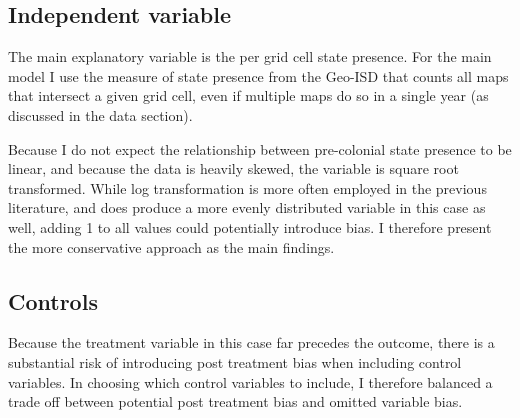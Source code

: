 \documentclass[12pt]{article}
\begin{document}

\subsection{Independent variable}

The main explanatory variable is the per grid cell state presence. For the main
model I use the measure of state presence from the Geo-ISD that counts all maps that
intersect a given grid cell, even if multiple maps do so in a single year (as
discussed in the data section).


Because I do not expect the relationship between pre-colonial state presence to
be linear, and because the data is heavily skewed, the variable is square root
transformed. While log transformation is more often employed in the previous
literature, and does produce a more evenly distributed variable in this case as
well, adding 1 to all values could potentially introduce bias. I therefore
present the more conservative approach as the main findings.

\subsection{Controls}

Because the treatment variable in this case far precedes the outcome, there is a
substantial risk of introducing post treatment bias when including control
variables. In choosing which control variables to include, I therefore 
balanced a trade off between potential post treatment bias and omitted variable
bias. 
\end{document}
